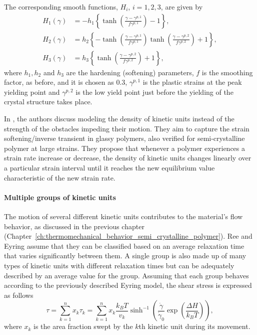 The corresponding smooth functions, $H_i$, $i=1,2,3$, are given by
\begin{align}
	H_1(\gamma)&=-h_1\left\{\tanh \left(\frac{\gamma-\gamma^{p,1}}{f \gamma^{p,1}}\right)-1\right\}, \\
	H_2(\gamma)&=h_2\left\{-\tanh \left(\frac{\gamma-\gamma^{p,1}}{f \gamma^{p,1}}\right) \tanh \left(\frac{\gamma-\gamma^{p,2}}{f \gamma^{p,2}}\right)+1\right\}, \\
	H_3(\gamma)&=h_3\left\{\tanh \left(\frac{\gamma-\gamma^{p,2}}{f \gamma^{p,2}}\right)+1\right\},
\end{align}
where $h_1, h_2$ and $h_3$ are the hardening (softening) parameters, $f$ is the smoothing factor, as before, and it is chosen as $0.3$, $\gamma^{p,1}$ is the plastic strains at the peak yielding point and $\gamma^{p,2}$ is the low yield point just before the yielding of the crystal structure takes place.


In \cite{gsellYieldTransientEffects1981}, the authors discuss modeling the density of kinetic units instead of the strength of the obstacles impeding their motion.
They aim to capture the strain softening/inverse transient in glassy polymers, also verified for semi-crystalline polymer at large strains.
They propose that whenever a polymer experiences a strain rate increase or decrease, the density of kinetic units changes linearly over a particular strain interval until it reaches the new equilibrium value characteristic of the new strain rate.

\paragraph{Multiple groups of kinetic units}

The motion of several different kinetic units contributes to the material's flow behavior, as discussed in the previous chapter (Chapter~\ref{ch:thermomechanical_behavior_semi_crystalline_polymer}).
Ree and Eyring \citep{reeTheoryNonNewtonian1955} assume that they can be classified based on an average relaxation time that varies significantly between them.
A single group is also made up of many types of kinetic units with different relaxation times but can be adequately described by an average value for the group.
Assuming that each group behaves according to the previously described Eyring model, the shear stress is expressed as follows
\begin{equation}
	\tau=\sum_{k=1}^n x_k \tau_k = \sum_{k=1}^n x_k\frac{k_B T}{v_k} \sinh^{-1}\left(\frac{\dot\gamma}{\dot\gamma_0}\exp\left(\frac{\Delta H}{k_B T}\right)\right),
\end{equation}
where $x_k$ is the area fraction swept by the $k$th kinetic unit during its movement.

